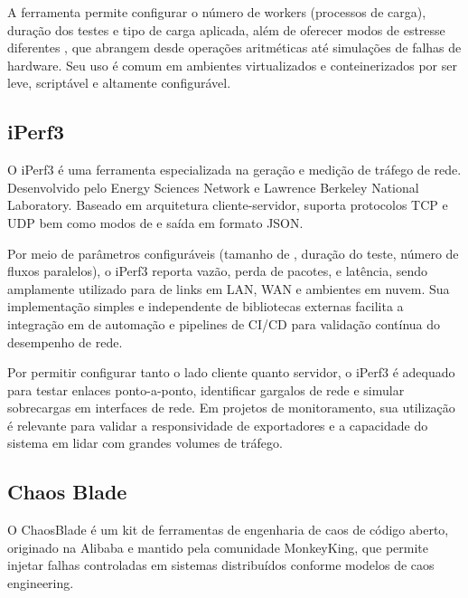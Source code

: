 A ferramenta permite configurar o número de workers (processos de carga), duração dos testes e tipo de carga aplicada, além de oferecer modos de estresse diferentes , que abrangem desde operações aritméticas até simulações de falhas de hardware. Seu uso é comum em ambientes virtualizados e conteinerizados por ser leve, scriptável e altamente configurável.

\subsection{iPerf3}
\label{subsection:iPerf3}

O iPerf3 \citep{iPerf32025} é uma ferramenta especializada na geração e medição de tráfego de rede. Desenvolvido pelo Energy Sciences Network e Lawrence Berkeley National Laboratory. Baseado em arquitetura cliente-servidor, suporta protocolos TCP e UDP bem como modos de  e saída em formato JSON.

Por meio de parâmetros configuráveis (tamanho de , duração do teste, número de fluxos paralelos), o iPerf3 reporta vazão, perda de pacotes,  e latência, sendo amplamente utilizado para  de links em LAN, WAN e ambientes em nuvem. Sua implementação simples e independente de bibliotecas externas facilita a integração em  de automação e pipelines de CI/CD para validação contínua do desempenho de rede.

Por permitir configurar tanto o lado cliente quanto servidor, o iPerf3 é adequado para testar enlaces ponto-a-ponto, identificar gargalos de rede e simular sobrecargas em interfaces de rede. Em projetos de monitoramento, sua utilização é relevante para validar a responsividade de exportadores e a capacidade do sistema em lidar com grandes volumes de tráfego.
    
\subsection{Chaos Blade}
\label{subsection:ChaosBlade}

O ChaosBlade \citep{chaosblade2025} é um kit de ferramentas de engenharia de caos de código aberto, originado na Alibaba e mantido pela comunidade MonkeyKing, que permite injetar falhas controladas em sistemas distribuídos conforme modelos de caos engineering.

